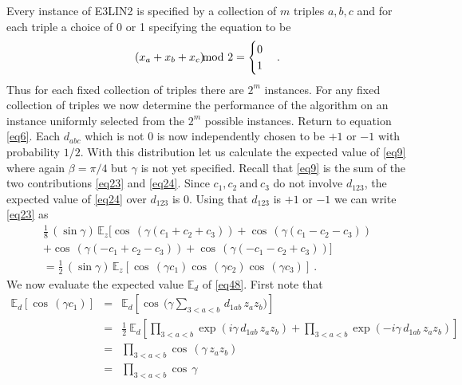 \documentclass[t11pt,preprint,preprintnumbers]{revtex4}
\begin{document}
 Every instance of E3LIN2 is specified by a collection of $m$ triples $a, b, c$ and for each triple a choice of 0 or 1 specifying the equation to be
 \begin{equation}\label{eq47}
(x_a + x_b + x_c)\negthickspace\negthickspace\negthickspace \mod 2 = \begin{cases} 0\\ 1 \end{cases} .
\end{equation}
Thus for each fixed collection of triples there are $2^m$ instances. For any  fixed collection of triples we now determine the performance of the algorithm on an instance uniformly selected from the $2^m$ possible instances.  Return to equation \eqref{eq6}.  Each $d_{abc}$ which is not 0 is now independently chosen to be $+1$ or $-1$ with probability $1/2$. With this distribution let us calculate the expected value of \eqref{eq9} where again $\beta = \pi/4$ but $\gamma$ is not yet specified. Recall that \eqref{eq9} is the sum of the two contributions \eqref{eq23} and \eqref{eq24}. Since $c_1, c_2 \ \text{and} \ c_3$ do not involve $d_{123}$, the expected value of \eqref{eq24} over $d_{123}$ is $0$. Using that $d_{123}$ is $+1$ or $-1$ we can write \eqref{eq23} as
\begin{multline}\label{eq48}
\tfrac{1}{8}\, (\sin \gamma)\, \mathbb{E}_z [\cos\, (\gamma(c_1+c_2+c_3))+\cos\, (\gamma (c_1-c_2-c_3))\\
+\cos\, (\gamma (-c_1+ c_2 - c_3))+\cos\, (\gamma (-c_1 - c_2 + c_3))] \\
=  \tfrac{1}{2}\, (\sin \gamma)\,  \mathbb{E}_z [ \cos\, (\gamma c_1) \cos\, (\gamma c_2) \cos\, (\gamma c_3)]\ .
\end{multline}
We now evaluate the expected value $\mathbb{E}_d$ of \eqref{eq48}. First note that
\begin{eqnarray}\label{eq49}
\mathbb{E}_d \left[\cos\, (\gamma c_1)\right] &=& \mathbb{E}_d \left[\cos\, \bigg(\gamma \sum\limits_{3 < a <b}\, d_{1ab}\, z_a z_b \bigg)\right]\nonumber\\[.5ex]
&=& \frac{1}{2}\ \mathbb{E}_d \left[\prod\limits_{3< a<b} \exp \left(i \gamma\, d_{1ab}\, z_a z_b\right) +  \prod\limits_{3< a<b} \exp \left(- i \gamma\, d_{1ab}\, z_a z_b\right) \right]\nonumber\\[.5ex]
&=& \prod\limits_{3< a<b} \cos\, (\gamma\, z_a z_b)\nonumber\\[.5ex]
&=& \prod\limits_{3< a<b} \cos\, \gamma
\end{eqnarray}
\end{document}
